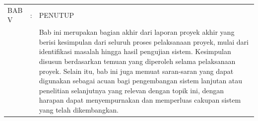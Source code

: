 \begin{longtable}{@{}llp{11cm}@{}}
    BAB V          & : & PENUTUP                                                                                                                                                                                                                                                                                                                                                                                                                                                                                                                                                                                                                                                                                                                                                                                        \\
                   &   & Bab ini merupakan bagian akhir dari laporan proyek akhir yang berisi kesimpulan dari seluruh proses pelaksanaan proyek, mulai dari identifikasi masalah hingga hasil pengujian sistem. Kesimpulan disusun berdasarkan temuan yang diperoleh selama pelaksanaan proyek. Selain itu, bab ini juga memuat saran-saran yang dapat digunakan sebagai acuan bagi pengembangan sistem lanjutan atau penelitian selanjutnya yang relevan dengan topik ini, dengan harapan dapat menyempurnakan dan memperluas cakupan sistem yang telah dikembangkan.                                                                                                                                                                                                                                                  \\[0.8em]


\end{longtable}
